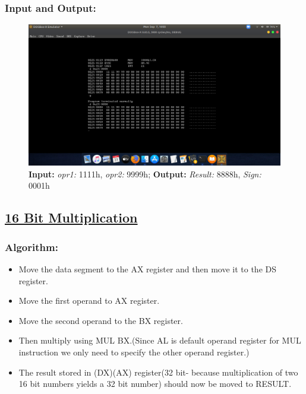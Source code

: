\documentclass[12pt,a4paper]{article}
\begin{document}
\begin{flushleft}
\subsubsection*{\textbf{Input and Output:}}
\begin{figure}[h]
    \centering
    \includegraphics[trim = 100mm 60mm 100mm 80mm, clip, width = \textwidth]{SubtractionIO.png}
    \caption{ \textbf{Input:} \emph{opr1:} 1111h, \emph{opr2:} 9999h; 
              \textbf{Output:} \emph{Result:} 8888h, \emph{Sign:} 0001h}
\end{figure}

\newpage
\subsection*{\textbf{\underline{16 Bit Multiplication}}}

\subsubsection*{\textbf{Algorithm:}}
\begin{itemize}
    \item Move the data segment to the AX register and then move it to the DS register.
    \item Move the first operand to AX register.
    \item  Move the second operand to the BX register.
    \item  Then multiply using MUL BX.(Since AL is default operand register for MUL instruction we only need to specify the other operand register.)
    \item  The result stored in (DX)(AX) register(32 bit- because multiplication of two 16 bit numbers yields a 32 bit number) should now be moved to RESULT.
\end{itemize}


\end{flushleft}
\end{document}
